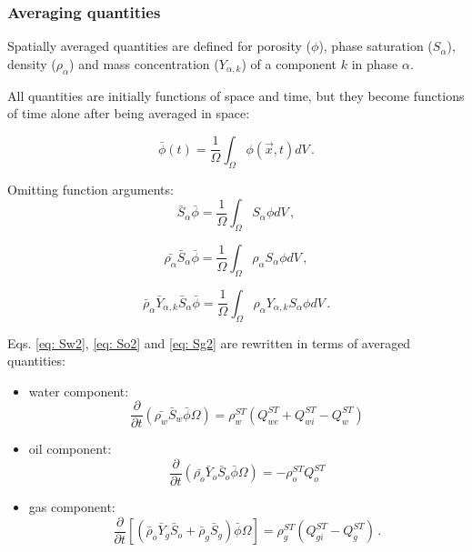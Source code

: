 \documentclass[authoryear,preprint,review,11pt]{elsarticle}
\begin{document}
\subsubsection{Averaging quantities}

Spatially averaged quantities are defined for porosity ($\phi$), phase saturation ($S_\alpha$), density ($\rho_\alpha$) and mass concentration ($Y_{\alpha,k}$) of a component $k$ in phase $\alpha$.

All quantities are initially functions of space and time, but they become functions of time alone after being averaged in space:

\begin{equation}
\bar{\phi} (t) = \frac{1}{\Omega}\int_{\Omega}\phi \left(\vec{x},t\right) dV \, .
\end{equation}

Omitting function arguments:
\begin{equation}
\bar{S}_\alpha\bar{\phi} = \frac{1}{\Omega}\int_{\Omega}S_\alpha \phi dV \, ,
\end{equation}

\begin{equation}
\bar{\rho_\alpha}\bar{S}_\alpha \bar{\phi} = \frac{1}{\Omega}\int_{\Omega}\rho_\alpha S_\alpha \phi dV \, ,
\end{equation}

\begin{equation}
\bar{\rho}_\alpha \bar{Y}_{\alpha,k}\bar{S}_\alpha \bar{\phi} = \frac{1}{\Omega}\int_{\Omega}\rho_\alpha Y_{\alpha,k} S_\alpha \phi dV \, .
\end{equation}

Eqs. \eqref{eq: Sw2}, \eqref{eq: So2} and \eqref{eq: Sg2} are rewritten in terms of averaged quantities:

\begin{itemize}
\item water component:
\begin{equation}\label{eq: Sw3}
\frac{\partial}{\partial t} \left( \bar{\rho_w}\bar{S}_w\bar{\phi} \Omega \right) = \rho_w^{ST}\left(Q_{we}^{ST} + Q_{wi}^{ST}-Q_w^{ST}\right)
\end{equation}

\item oil component:
\begin{equation}\label{eq: So3}
\frac{\partial}{\partial t} \left( \bar{\rho_o}\bar{Y}_o\bar{S}_o\bar{\phi} \Omega \right) = - \rho_o^{ST}Q_o^{ST}
\end{equation}

\item gas component:
\begin{equation}\label{eq: Sg3}
\frac{\partial}{\partial t} \left[\left( \bar{\rho}_o\bar{Y}_g \bar{S}_o + \bar{\rho}_g \bar{S}_g \right) \bar{\phi} \Omega\right] =  \rho_g^{ST}(Q_{gi}^{ST}-Q_g^{ST}) \, .
\end{equation}
\end{itemize}
\end{document}
